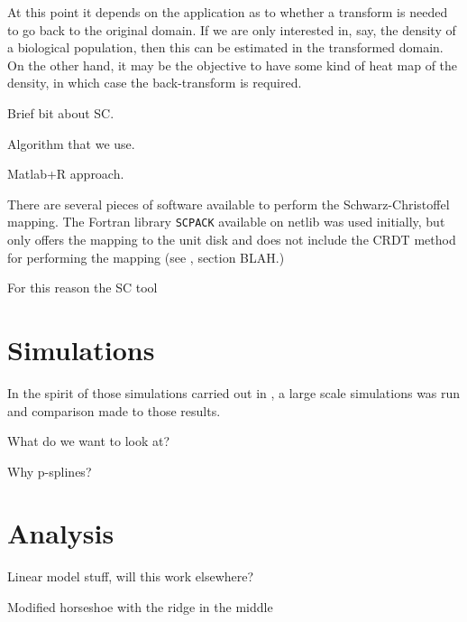 \documentclass[a4paper,10pt]{amsart}
\newcommand{\sch}{Schwarz-Christoffel }
\begin{document}
At this point it depends on the application as to whether a transform is needed to go back to the original domain. If we are only interested in, say, the density of a biological population, then this can be estimated in the transformed domain. On the other hand, it may be the objective to have some kind of heat map of the density, in which case the back-transform is required.






Brief bit about SC.

Algorithm that we use.




Matlab+R approach.

There are several pieces of software available to perform the \sch mapping. The Fortran library \texttt{SCPACK} available on netlib was used initially, but only offers the mapping to the unit disk and does not include the CRDT method for performing the mapping (see \cite{miller08}, section BLAH.) 

For this reason the SC tool




\section{Simulations}

In the spirit of those simulations carried out in \cite{soap}, a large scale simulations was run and comparison made to those results.




What do we want to look at?

Why p-splines?


\section{Analysis}


Linear model stuff, will this work elsewhere?





Modified horseshoe with the ridge in the middle










\end{document}
